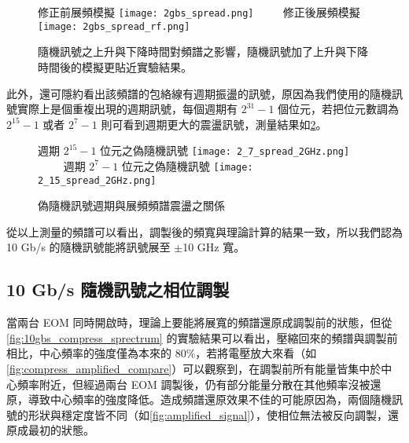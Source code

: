 \documentclass[class=NCU_thesis, crop=false]{standalone}
\begin{document}
\begin{figure}[!hbt]
    \centering
    \subcaptionbox
        {修正前展頻模擬
        \label{fig:subfig_fig1}}
        {\texttt{[image: 2gbs\_spread.png]}}
    ~~~~
    \subcaptionbox
        {修正後展頻模擬
        \label{fig:subfig_fig2}}
        {\texttt{[image: 2gbs\_spread\_rf.png]}}
    \caption{隨機訊號之上升與下降時間對頻譜之影響，隨機訊號加了上升與下降時間後的模擬更貼近實驗結果。}
    \label{fig:simulation_rising_falling}
\end{figure}


此外，還可隱約看出該頻譜的包絡線有週期振盪的訊號，原因為我們使用的隨機訊號實際上是個重複出現的週期訊號，每個週期有 $2^{31}-1$ 個位元，若把位元數調為 $2^{15}-1$ 或者 $2^{7}-1$ 則可看到週期更大的震盪訊號，測量結果如\cref{fig:different_length_PRBS}。

\begin{figure}[!hbt]
    \centering
    \subcaptionbox
        {週期 $2^{15}-1$ 位元之偽隨機訊號
        \label{fig:subfig_fig1}}
        {\texttt{[image: 2\_7\_spread\_2GHz.png]}}
    ~~~~
    \subcaptionbox
        {週期 $2^{7}-1$ 位元之偽隨機訊號
        \label{fig:subfig_fig2}}
        {\texttt{[image: 2\_15\_spread\_2GHz.png]}}
    \caption{偽隨機訊號週期與展頻頻譜震盪之關係}
    \label{fig:different_length_PRBS}
\end{figure}

從以上測量的頻譜可以看出，調製後的頻寬與理論計算的結果一致，所以我們認為 10 Gb/s 的隨機訊號能將訊號展至 $\pm$10 GHz 寬。

\subsection{10 Gb/s 隨機訊號之相位調製}

當兩台 EOM 同時開啟時，理論上要能將展寬的頻譜還原成調製前的狀態，但從\cref{fig:10gbs_compress_sprectrum} 的實驗結果可以看出，壓縮回來的頻譜與調製前相比，中心頻率的強度僅為本來的 80\%，若將電壓放大來看（如\cref{fig:compress_amplified_compare}）可以觀察到，在調製前所有能量皆集中於中心頻率附近，但經過兩台 EOM 調製後，仍有部分能量分散在其他頻率沒被還原，導致中心頻率的強度降低。造成頻譜還原效果不佳的可能原因為，兩個隨機訊號的形狀與穩定度皆不同（如\cref{fig:amplified_signal}），使相位無法被反向調製，還原成最初的狀態。
\end{document}
